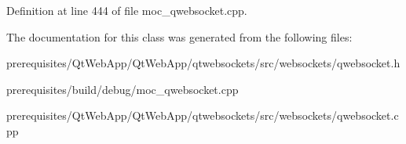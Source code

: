Definition at line 444 of file moc\+\_\+qwebsocket.\+cpp.



The documentation for this class was generated from the following files\+:\begin{DoxyCompactItemize}
\item 
prerequisites/\+Qt\+Web\+App/\+Qt\+Web\+App/qtwebsockets/src/websockets/qwebsocket.\+h\item 
prerequisites/build/debug/moc\+\_\+qwebsocket.\+cpp\item 
prerequisites/\+Qt\+Web\+App/\+Qt\+Web\+App/qtwebsockets/src/websockets/qwebsocket.\+cpp\end{DoxyCompactItemize}
